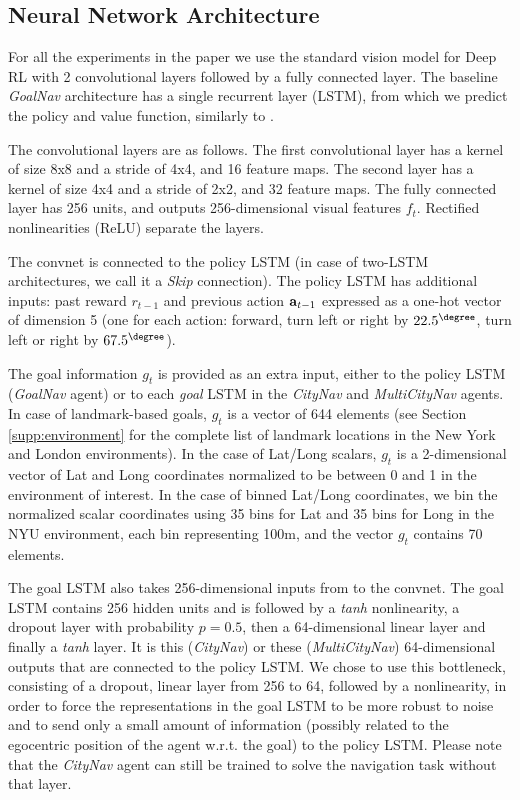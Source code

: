 \subsection{Neural Network Architecture}
\label{supp:architecture}

For all the experiments in the paper we use the standard vision model for Deep RL \cite{mnih2016asynchronous} with 2 convolutional layers followed by a fully connected layer. The baseline \emph{GoalNav} architecture has a single recurrent layer (LSTM), from which we predict the policy and value function, similarly to \cite{mnih2016asynchronous}.

The convolutional layers are as follows. The first convolutional layer has a kernel of size 8x8 and a stride of 4x4, and 16 feature maps. The second layer has a kernel of size 4x4 and a stride of 2x2, and 32 feature maps. The fully connected layer has 256 units, and outputs 256-dimensional visual features $f_t$. Rectified nonlinearities (ReLU) separate the layers.

The convnet is connected to the policy LSTM (in case of two-LSTM architectures, we call it a \emph{Skip} connection). The policy LSTM has additional inputs: past reward $r_{t-1}$ and previous action ${\bf a}_{t-1}$ expressed as a one-hot vector of dimension 5 (one for each action: forward, turn left or right by $22.5^{\degree}$, turn left or right by $67.5^{\degree}$).

The goal information $g_t$ is provided as an extra input, either to the policy LSTM (\emph{GoalNav} agent) or to each \emph{goal} LSTM in the \emph{CityNav} and \emph{MultiCityNav} agents. In case of landmark-based goals, $g_t$ is a vector of 644 elements (see Section \ref{supp:environment} for the complete list of landmark locations in the New York and London environments). In the case of Lat/Long scalars, $g_t$ is a 2-dimensional vector of Lat and Long coordinates normalized to be between 0 and 1 in the environment of interest. In the case of binned Lat/Long coordinates, we bin the normalized scalar coordinates using 35 bins for Lat and 35 bins for Long in the NYU environment, each bin representing 100m, and the vector $g_t$ contains 70 elements.

The goal LSTM also takes 256-dimensional inputs from to the convnet. The goal LSTM contains 256 hidden units and is followed by a \emph{tanh} nonlinearity, a dropout layer with probability $p=0.5$, then a 64-dimensional linear layer and finally a \emph{tanh} layer. It is this (\emph{CityNav}) or these (\emph{MultiCityNav}) 64-dimensional outputs that are connected to the policy LSTM. We chose to use this bottleneck, consisting of a dropout, linear layer from 256 to 64, followed by a nonlinearity, in order to force the representations in the goal LSTM to be more robust to noise and to send only a small amount of information (possibly related to the egocentric position of the agent w.r.t. the goal) to the policy LSTM. Please note that the \emph{CityNav} agent can still be trained to solve the navigation task without that layer.

